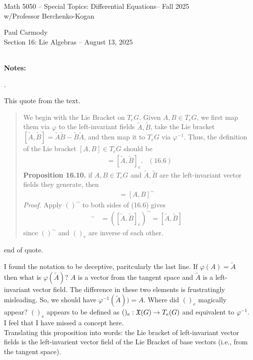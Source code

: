\documentclass[12pt,a4paper]{report}
\newcommand{\CLASSNAME}{Math 5050 -- Special Topics: Differential Equations}
\newcommand{\STUDENTNAME}{Paul Carmody}
\newcommand{\ASSIGNMENT}{Section 16: Lie Algebras }
\newcommand{\DUEDATE}{August 13, 2025}
\newcommand{\PROFESSOR}{Professor Berchenko-Kogan}
\newcommand{\SEMESTER}{Fall 2025}
\begin{document}
\begin{center}
	\Large{\CLASSNAME -- \SEMESTER} \\
	\large{ w/\PROFESSOR}
\end{center}
\begin{center}
	\STUDENTNAME \\
	\ASSIGNMENT -- \DUEDATE\\
\end{center} 

\noindent \textbf{\\\large{Notes:}}

\begin{remark}.

\noindent This quote from the text.
	\begin{quote}
		We begin with the Lie Bracket on $T_eG$.  Given $A,B \in T_eG$, we first map them via $\varphi$ to the left-invariant fields $\tilde{A}, \tilde{B}$, take the Lie bracket $[\tilde{A},\tilde{B}]= \tilde{A}\tilde{B}-\tilde{B}\tilde{A}$, and then map it to $T_eG$ via $\varphi^{-1}$.  Thus, the definition of the Lie bracket $[A,B] \in T_eG$ should be 
		\begin{align*}
			[A,B] &= [\tilde{A},\tilde{B}]_e. &(16.6)
		\end{align*}\textbf{Proposition 16.10.}  if $A,B \in T_eG$ and $\tilde{A},\tilde{B}$ are the left-invariant vector fields they generate, then  
		\begin{align*}
			[\tilde{A},\tilde{B}] = [A,B]^\sim
		\end{align*}\textit{Proof.}  Apply $()^\sim$ to both sides of (16.6) gives
		\begin{align*}
			[A,B]^\sim &= ([\tilde{A},\tilde{B}]_e)^\sim = [\tilde{A},\tilde{B}]
\end{align*}since $()^\sim$ and $()_e$ are inverse of each other.
	\end{quote}end of quote.
	
I found the notation to be deceptive, paritcularly the last line.  If $\varphi(A) = \tilde{A}$ then what is $\varphi(\tilde{A})$?  $A$ is a vector from the tangent space and $\tilde{A}$ is a left-invariant vector field.  The difference in these two elements is frustratingly misleading.  So, we should have $\varphi^{-1}(\tilde{A}))=A$.  Where did $()_e$ magically appear? $()_e$ appears to be defined as $()_e: \mathfrak{X}(G) \to T_e(G)$ and equivalent to $\varphi^{-1}$.  I feel that I have missed a concept here.\\

Translating this proposition into words: the Lie bracket of left-invariant vector fields is the left-invarient vector field of the Lie Bracket of base vectors (i.e., from the tangent space).
\end{remark}
\end{document}
